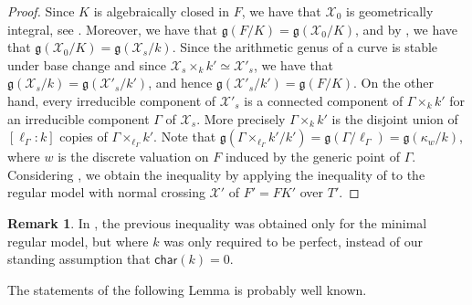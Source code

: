 \documentclass[a4paper,12pt,reqno]{amsart}
\newcommand\mc\mathcal
\theoremstyle{definition}
\newtheorem{rem}[thm]{Remark}
\numberwithin{equation}{thm}
\newcommand{\car}{\mathsf{char}}
\begin{document}
\begin{proof}
 Since $K$ is algebraically closed in $F$, we have that 
 $\mc{X}_0$ is geometrically integral, see \cite[Corollary 2.3.14]{Liu}.  Moreover, we have that $\mathfrak{g}(F/K)=\mathfrak{g}(\mc{X}_0/K)$, and by \cite[Corollary 8.3.6]{Liu}, we have that $\mathfrak{g}(\mc{X}_0/K)=\mathfrak{g}(\mc{X}_s/k)$.
 Since the arithmetic genus of a curve is stable under base change and since $\mc{X}_s \times_k k' \simeq \mc{X}'_s$, we have that $\mathfrak{g}(\mc{X}_s/k)=\mathfrak{g}(\mc{X}'_s/k')$, and hence $\mathfrak{g}(\mc{X}'_s/k')=\mathfrak{g}(F/K)$.
 On the other hand, every irreducible component of $\mc{X}'_s$ is a connected component of $\Gamma \times_k k'$ for an irreducible component $\Gamma$ of $\mc{X}_{s}$.
 More precisely $\Gamma \times_k k'$ is the disjoint union of $[\ell_\Gamma: k]$ copies of $\Gamma \times_{\ell_\Gamma} k'$. Note that $\mathfrak{g}(\Gamma \times_{\ell_\Gamma} k' /k')=\mathfrak{g}(\Gamma/\ell_\Gamma)=\mathfrak{g}(\kappa_w/k)$, where $w$ is the discrete valuation on $F$ induced by the generic point of $\Gamma$. Considering , we obtain the inequality by applying the inequality of  to the regular model with normal crossing $\mc{X}'$ of $F'=FK'$ over $T'$.
\end{proof}

\begin{rem}In \cite[Theorem 5.3]{BG24}, the previous inequality was obtained only for the minimal regular model, but where $k$ was only required to be perfect, instead of our standing assumption that $\car(k)=0$.
\end{rem}

The statements of the following Lemma is probably well known. 
\end{document}
